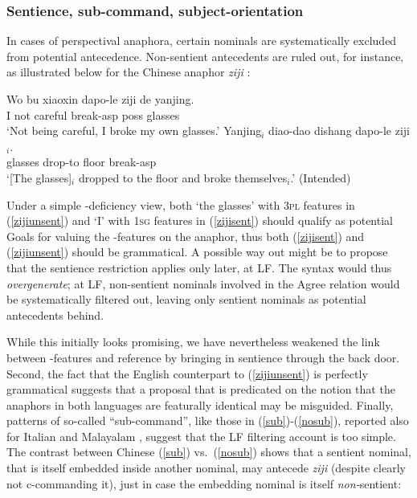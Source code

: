 \documentclass[output=paper, modfonts, nonflat]{langsci/langscibook}
\begin{document}
 \subsubsection{Sentience, sub-command, subject-orientation}

 In cases of perspectival anaphora, certain nominals are
 systematically excluded from potential antecedence. Non-sentient
 antecedents are ruled out, for instance, as illustrated below for the
 Chinese anaphor \textit{ziji} \citep{huangliu:2001}:

 \ea\label{zijisent}\gll Wo bu xiaoxin dapo-le ziji de
 yanjing.\\
 I not careful break-{\sc asp} \anaph{} {\sc poss} glasses\\
 \glt `Not being careful, I broke my own glasses.'
 \ex\label{zijiunsent}\gll *Yanjing$_i$ diao-dao dishang dapo-le
 ziji$_i$.\\
 glasses drop-to  floor break-{\sc asp} \anaph\\
 \glt `[The glasses]$_i$ dropped to the floor and broke
 themselves$_i$.'  (Intended) \z

\noindent Under a simple \ph-deficiency view, both `the glasses' with
 \textsc{3pl} features in (\ref{zijiunsent}) and `I' with \textsc{1sg}
 features in (\ref{zijisent}) should qualify as potential Goals for
 valuing the \ph-features on the anaphor, thus both (\ref{zijisent})
 and (\ref{zijiunsent}) should be grammatical. A possible way out might
 be to propose that the sentience restriction applies only later, at
 LF. The syntax would thus \emph{overgenerate}; at LF, non-sentient
 nominals involved in the Agree relation would be systematically
 filtered out, leaving only sentient nominals as potential antecedents
 behind.

 While this initially looks promising, we have nevertheless
 weakened the link between \ph-features and reference by bringing in
 sentience through the back door. Second, the fact that the English
 counterpart to (\ref{zijiunsent}) is perfectly grammatical suggests
 that a proposal that is predicated on the notion that the anaphors in
 both languages are featurally identical may be misguided. Finally,
 patterns of so-called ``sub-command'', like those in
 (\ref{sub})-(\ref{nosub}), reported also for Italian
 \citep{giorgi:2006} and Malayalam \citep{jayaseelan:1997}, suggest
 that the LF filtering account is too simple. The contrast between
 Chinese (\ref{sub}) vs.\ (\ref{nosub}) shows that a sentient nominal,
 that is itself embedded inside another nominal, may antecede
 \textit{ziji} (despite clearly not c-commanding it), just in case the
 embedding nominal is itself \emph{non-}sentient:
  
\end{document}
